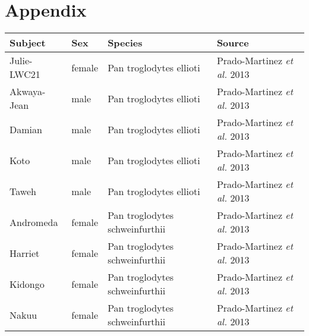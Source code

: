\section*{Appendix}

\begin{table}[h]
\centering
\begin{tabular}{|l|l|l|l|}
\hline
\textbf{Subject} & \textbf{Sex} & \textbf{Species} & \textbf{Source} \\
\hline
 

Julie-LWC21  &  female  &  Pan troglodytes ellioti  & Prado-Martinez \textit{et al.} 2013 \cite{pradomartinezgagp}  \\
Akwaya-Jean  &  male  &  Pan troglodytes ellioti  & Prado-Martinez \textit{et al.} 2013 \cite{pradomartinezgagp}  \\
Damian  &  male  &  Pan troglodytes ellioti  & Prado-Martinez \textit{et al.} 2013 \cite{pradomartinezgagp}  \\
Koto  &  male  &  Pan troglodytes ellioti  & Prado-Martinez \textit{et al.} 2013 \cite{pradomartinezgagp}  \\
Taweh  &  male  &  Pan troglodytes ellioti  & Prado-Martinez \textit{et al.} 2013 \cite{pradomartinezgagp}  \\
Andromeda  &  female  &  Pan troglodytes schweinfurthii  & Prado-Martinez \textit{et al.} 2013 \cite{pradomartinezgagp}  \\
Harriet  &  female  &  Pan troglodytes schweinfurthii  & Prado-Martinez \textit{et al.} 2013 \cite{pradomartinezgagp}  \\
Kidongo  &  female  &  Pan troglodytes schweinfurthii  & Prado-Martinez \textit{et al.} 2013 \cite{pradomartinezgagp}  \\
Nakuu  &  female  &  Pan troglodytes schweinfurthii  & Prado-Martinez \textit{et al.} 2013 \cite{pradomartinezgagp}  \\

\end{tabular}
\end{table}
